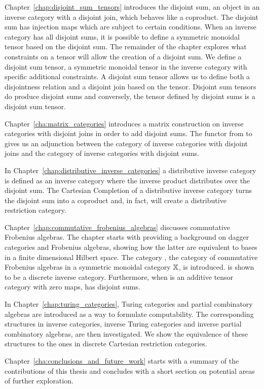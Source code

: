 Chapter~\ref{chap:disjoint_sum_tensors} introduces the disjoint sum, an object in an inverse
category with a disjoint join, which behaves like a coproduct. The disjoint sum has injection maps
which are subject to certain conditions. When an inverse category has all disjoint sums, it is
possible to define a symmetric monoidal tensor based on the disjoint sum. The remainder of the
chapter explores what constraints on a tensor will allow the creation of  a disjoint sum. We define
a disjoint sum tensor, a symmetric monoidal tensor in the inverse category with specific additional
constraints. A disjoint sum tensor allows us to define both a disjointness relation and a disjoint
join based on the tensor. Disjoint sum tensors do produce disjoint sums and conversely, the tensor
defined by disjoint sums is a disjoint sum tensor.

Chapter~\ref{cha:matrix_categories} introduces a matrix construction on inverse categories with
disjoint joins in order to add disjoint sums. The functor from \X to \imatx gives us an adjunction
between the category of inverse categories with disjoint joins and the
category of inverse categories with disjoint sums.

In Chapter~\ref{chap:distributive_inverse_categories}  a distributive inverse category is defined as
an inverse category where the inverse product distributes over the disjoint sum. The Cartesian
Completion of a distributive inverse category turns the disjoint sum into a coproduct and, in fact,
will create a distributive restriction category.

Chapter~\ref{chap:commutative_frobenius_algebras} discusses commutative Frobenius algebras. The
chapter starts with providing a background on dagger categories and Frobenius algebras, showing how
the latter are equivalent to bases in a finite dimensional Hilbert space. The category \CFrob,
the category of commutative Frobenius algebras in a symmetric monoidal category $\mathbb{X}$, is
introduced. \CFrob is shown to be a discrete inverse category. Furthermore, when \X is an
additive tensor category with zero maps, \CFrob has disjoint sums.

In Chapter~\ref{chap:turing_categories}, Turing categories and partial combinatory algebras are
introduced as a way to formulate computability. The corresponding structures in inverse categories,
inverse Turing categories and inverse partial combinatory algebras, are then investigated. We show the
equivalence of these structures to the ones in discrete Cartesian restriction categories.

Chapter~\ref{cha:conclusions_and_future_work} starts with a summary of the contributions of this
thesis and concludes with a short section on potential areas of further exploration.



